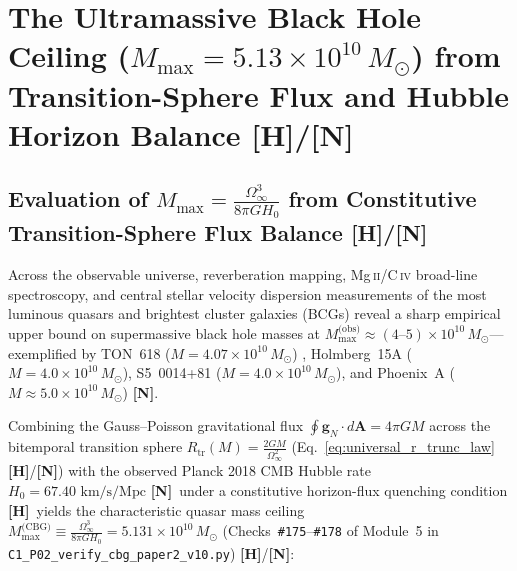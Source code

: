 \documentclass[11pt,a4paper]{article}
\newcommand{\catH}{\textbf{\textcolor{orange!85!black}{[H]}}}
\newcommand{\catN}{\textbf{\textcolor{teal!75!black}{[N]}}}
\theoremstyle{plain}
\theoremstyle{definition}
\theoremstyle{remark}
\numberwithin{equation}{section}
\begin{document}
\section{\texorpdfstring{The Ultramassive Black Hole Ceiling ($M_{\max} = 5.13 \times 10^{10}\,M_\odot$) from Transition-Sphere Flux and Hubble Horizon Balance \catH/\catN}{The Ultramassive Black Hole Ceiling and Eddington Accretion Quenching}}

\subsection{\texorpdfstring{Evaluation of $M_{\max} = \frac{\Omega_{\infty}^3}{8\pi G H_0}$ from Constitutive Transition-Sphere Flux Balance \catH/\catN}{Evaluation of M_max from Constitutive Transition-Sphere Flux Balance}}

Across the observable universe, reverberation mapping, Mg\,\textsc{ii}/C\,\textsc{iv} broad-line spectroscopy, and central stellar velocity dispersion measurements of the most luminous quasars and brightest cluster galaxies (BCGs) reveal a sharp empirical upper bound on supermassive black hole masses at $M_{\max}^{\text{(obs)}} \approx (4\text{--}5) \times 10^{10}\,M_\odot$---exemplified by TON~618 ($M = 4.07 \times 10^{10}\,M_\odot$) \cite{shemmer2004}, Holmberg~15A ($M = 4.0 \times 10^{10}\,M_\odot$), S5~0014+81 ($M = 4.0 \times 10^{10}\,M_\odot$), and Phoenix~A ($M \approx 5.0 \times 10^{10}\,M_\odot$) \cite{mcdonald2012,natarajan2009,king2016} \catN.

Combining the Gauss--Poisson gravitational flux $\oint \mathbf{g}_N\cdot d\mathbf{A} = 4\pi G M$ across the bitemporal transition sphere $R_{\text{tr}}(M) = \frac{2GM}{\Omega_{\infty}^2}$ (Eq.~\ref{eq:universal_r_trunc_law} \catH/\catN) with the observed Planck 2018 CMB Hubble rate $H_0 = 67.40\text{ km/s/Mpc}$ \catN\ under a constitutive horizon-flux quenching condition \catH\ yields the characteristic quasar mass ceiling $M_{\max}^{\text{(CBG)}} \equiv \frac{\Omega_{\infty}^3}{8\pi G H_0} = 5.131 \times 10^{10}\,M_\odot$ (Checks~\texttt{\#175}--\texttt{\#178} of Module~5 in \allowbreak\texttt{C1\_P02\_verify\_cbg\_paper2\_v10.py}) \catH/\catN:
\end{document}
